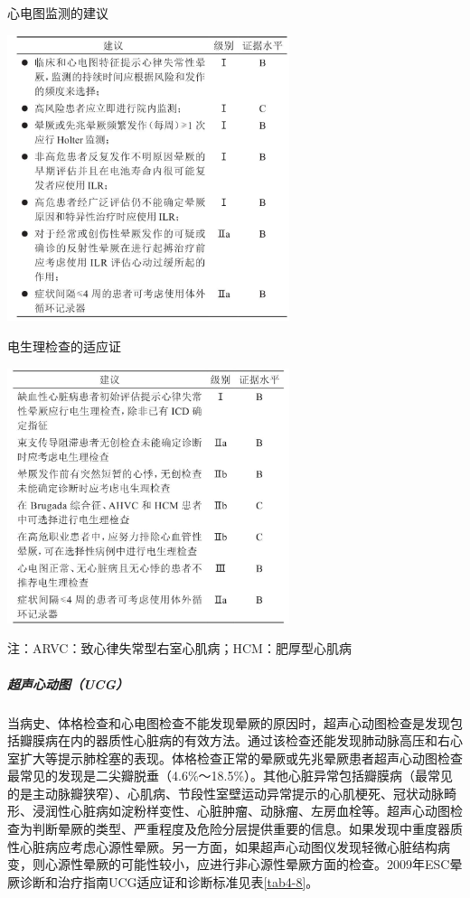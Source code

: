 \begin{table}[htbp]
\centering
\caption{心电图监测的建议}
\label{tab4-6}
\includegraphics[width=3.25in,height=3.30208in]{./images/Image00023.jpg}
\end{table}

\begin{table}[htbp]
\centering
\caption{电生理检查的适应证}
\label{tab4-7}
\includegraphics[width=3.25in,height=2.9375in]{./images/Image00024.jpg}
\end{table}

注：ARVC：致心律失常型右室心肌病；HCM：肥厚型心肌病

\subparagraph{超声心动图（UCG）}

当病史、体格检查和心电图检查不能发现晕厥的原因时，超声心动图检查是发现包括瓣膜病在内的器质性心脏病的有效方法。通过该检查还能发现肺动脉高压和右心室扩大等提示肺栓塞的表现。体格检查正常的晕厥或先兆晕厥患者超声心动图检查最常见的发现是二尖瓣脱垂（4.6\%～18.5\%）。其他心脏异常包括瓣膜病（最常见的是主动脉瓣狭窄）、心肌病、节段性室壁运动异常提示的心肌梗死、冠状动脉畸形、浸润性心脏病如淀粉样变性、心脏肿瘤、动脉瘤、左房血栓等。超声心动图检查为判断晕厥的类型、严重程度及危险分层提供重要的信息。如果发现中重度器质性心脏病应考虑心源性晕厥。另一方面，如果超声心动图仪发现轻微心脏结构病变，则心源性晕厥的可能性较小，应进行非心源性晕厥方面的检查。2009年ESC晕厥诊断和治疗指南UCG适应证和诊断标准见表\ref{tab4-8}。

